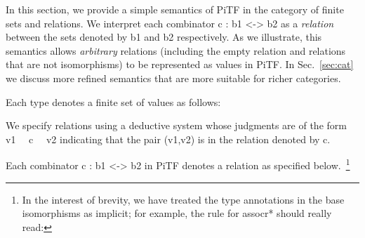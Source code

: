\documentclass{llncs}
\begin{document}
In this section, we provide a simple semantics of {{PiTF}} in the category of
finite sets and relations. We interpret each combinator {{c : b1 <-> b2}} as
a \emph{relation} between the sets denoted by {{b1}} and {{b2}}
respectively. As we illustrate, this semantics allows \emph{arbitrary}
relations (including the empty relation and relations that are not
isomorphisms) to be represented as values in {{PiTF}}.  In Sec.~\ref{sec:cat}
we discuss more refined semantics that are more suitable for richer
categories.

\begin{definition}
\label{chx:def:denot}
Each type denotes a finite set of values as follows:
\end{definition}

We specify
relations using a deductive system whose judgments are of the form 
{{ v1 ~~c~~ v2 }} indicating that the pair {{(v1,v2)}} is in the relation 
denoted by {{c}}.

\begin{definition}
\label{def:relational-PiTF}
Each combinator {{c : b1 <-> b2}} in {{PiTF}} denotes a relation
as specified below.~\footnote{
In the interest of brevity, we have treated the type annotations in the base
isomorphisms as implicit; for example, the rule for {{assocr*}} should really
read:

}
%
%
%
%
%
%
%
%
%
%
%
%
%
%
\end{definition}
\end{document}
